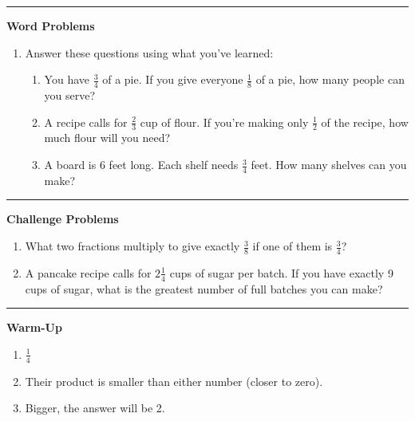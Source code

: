 \documentclass[
  letterpaper,
  DIV=11,
  numbers=noendperiod]{scrreprt}
\begin{document}
\begin{center}\rule{0.5\linewidth}{0.5pt}\end{center}

\textbf{Word Problems}

\begin{enumerate}
\def\labelenumi{\arabic{enumi}.}
\setcounter{enumi}{3}
\item
  Answer these questions using what you've learned:

  \begin{enumerate}
  \def\labelenumii{\alph{enumii}.}
  \item
    You have \(\frac{3}{4}\) of a pie. If you give everyone
    \(\frac{1}{8}\) of a pie, how many people can you serve?
  \item
    A recipe calls for \(\frac{2}{3}\) cup of flour. If you're making
    only \(\frac{1}{2}\) of the recipe, how much flour will you need?
  \item
    A board is 6 feet long. Each shelf needs \(\frac{3}{4}\) feet. How
    many shelves can you make?
  \end{enumerate}
\end{enumerate}

\begin{center}\rule{0.5\linewidth}{0.5pt}\end{center}

\textbf{Challenge Problems}

\begin{enumerate}
\def\labelenumi{\arabic{enumi}.}
\setcounter{enumi}{4}
\item
  What two fractions multiply to give exactly \(\frac{3}{8}\) if one of
  them is \(\frac{3}{4}\)?
\item
  A pancake recipe calls for \(2\tfrac{1}{4}\) cups of sugar per batch.
  If you have exactly 9 cups of sugar, what is the greatest number of
  full batches you can make?
\end{enumerate}

\begin{center}\rule{0.5\linewidth}{0.5pt}\end{center}

\textbf{Warm-Up}

\begin{enumerate}
\def\labelenumi{\arabic{enumi}.}
\item
  \(\frac{1}{4}\)
\item
  Their product is smaller than either number (closer to zero).
\item
  Bigger, the answer will be 2.
\end{enumerate}
\end{document}
